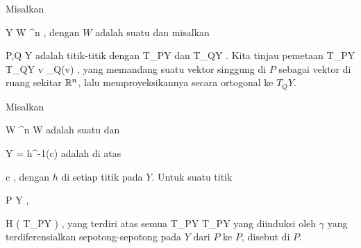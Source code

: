 {}
{

Misalkan

\mavergleichskette
{\vergleichskette
{ Y
}
{ \subseteq }{ W
}
{ \subseteq }{ \R^n
}
{    }{
}
{   }{
}
}
{}{}{,}
dengan $W$
adalah suatu
dan misalkan

\mavergleichskette
{\vergleichskette
{ P,Q
}
{ \in }{ Y
}
{  }{
}
{    }{
}
{   }{
}
}
{}{}{}
adalah titik-titik dengan
\mathkor {} {T_PY} {dan} {T_QY} {.}
Kita tinjau pemetaan
 {T_PY} { T_QY
} { v } { \pi_Q(v)
} {,}
yang memandang suatu vektor singgung di $P$ sebagai vektor di ruang sekitar ${\mathbb R}^n$, lalu memproyeksikannya secara ortogonal ke $T_QY$.

}
{} {}

Misalkan

\mavergleichskette
{\vergleichskette
{ W
}
{ \subseteq }{ \R^n
}
{  }{
}
{    }{
}
{   }{
}
}
{}{}{}
 { W } { \R
} {}
adalah suatu
dan

\mavergleichskette
{\vergleichskette
{ Y
}
{ = }{ h^{-1}(c)
}
{  }{
}
{    }{
}
{   }{
}
}
{}{}{}
adalah
di atas

\mavergleichskette
{\vergleichskette
{ c
}
{ \in }{ \R
}
{  }{
}
{    }{
}
{   }{
}
}
{}{}{,}
dengan $h$
di setiap titik pada $Y$. Untuk suatu titik

\mavergleichskette
{\vergleichskette
{ P
}
{ \in }{ Y
}
{  }{
}
{    }{
}
{   }{
}
}
{}{}{,}

\mavergleichskette
{\vergleichskette
{ H
}
{ \subseteq }{  \left(  T_PY  \right)
}
{  }{
}
{    }{
}
{   }{
}
}
{}{}{,}
yang terdiri atas semua
\maabbdisp {\Psi_\gamma} {T_PY} {T_PY
} {}
yang diinduksi oleh
$\gamma$ yang terdiferensialkan sepotong-sepotong pada $Y$ dari $P$ ke $P$, disebut
di $P$.


